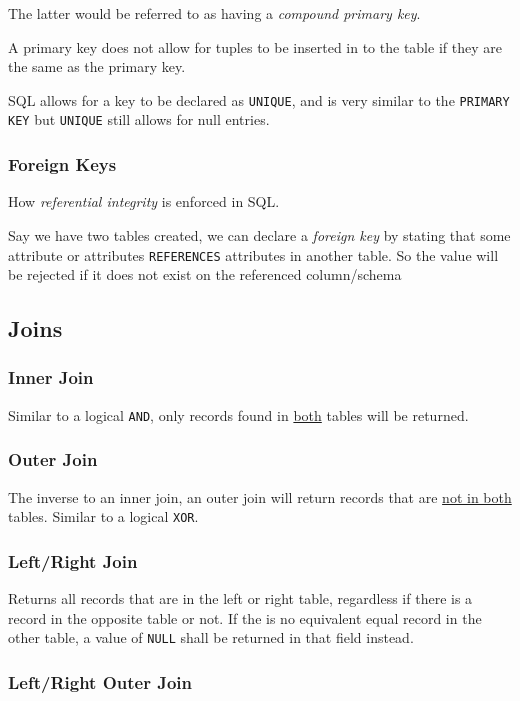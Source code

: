 \documentclass{article}
\begin{document}
The latter would be referred to as having a \textit{compound primary key}.

A primary key does not allow for tuples to be inserted in to the table if they are the same as the primary key.

SQL allows for a key to be declared as \texttt{UNIQUE}, and is very similar to the \texttt{PRIMARY KEY} but \texttt{UNIQUE} still allows for null entries.

\subsubsection*{Foreign Keys}

How \textit{referential integrity} is enforced in SQL.

Say we have two tables created, we can declare a \textit{foreign key} by stating that some attribute or attributes \texttt{REFERENCES} attributes in another table. So the value will be rejected if it does not exist on the referenced column/schema

\subsection{Joins}

\subsubsection*{Inner Join}

Similar to a logical \texttt{AND}, only records found in \underline{both} tables will be returned.

\subsubsection*{Outer Join}

The inverse to an inner join, an outer join will return records that are \underline{not in both} tables. Similar to a logical \texttt{XOR}.

\subsubsection*{Left/Right Join}

Returns all records that are in the left or right table, regardless if there is a record in the opposite table or not. If the is no equivalent equal record in the other table, a value of \texttt{NULL} shall be returned in that field instead.

\subsubsection*{Left/Right Outer Join}
\end{document}
